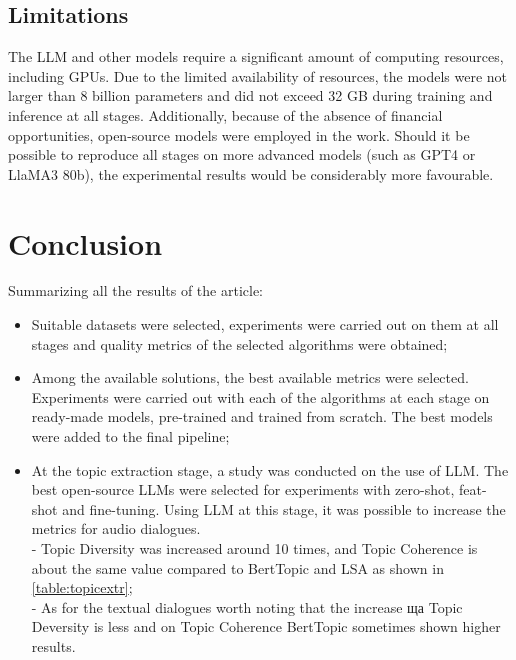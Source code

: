 \documentclass[PMI,VKR]{HSEUniversity}
\begin{document}
\section{Limitations}

The LLM and other models require a significant amount of computing resources, including GPUs. Due to the limited availability of resources, the models were not larger than 8 billion parameters and did not exceed 32 GB during training and inference at all stages. 
Additionally, because of the absence of financial opportunities, open-source models were employed in the work. Should it be possible to reproduce all stages on more advanced models (such as GPT4 or LlaMA3 80b), the experimental results would be considerably more favourable.

\chapter*{Conclusion}

Summarizing all the results of the article:
\begin{itemize}
    \item Suitable datasets were selected, experiments were carried out on them at all stages and quality metrics of the selected algorithms were obtained;
    \item Among the available solutions, the best available metrics were selected. Experiments were carried out with each of the algorithms at each stage on ready-made models, pre-trained and trained from scratch. The best models were added to the final pipeline;
    \item At the topic extraction stage, a study was conducted on the use of LLM. The best open-source LLMs were selected for experiments with zero-shot, feat-shot and fine-tuning. Using LLM at this stage, it was possible to increase the metrics for audio dialogues. \\
     - Topic Diversity was increased around 10 times, and Topic Coherence is about the same value compared to BertTopic and LSA as shown in \ref{table:topicextr}; \\
     - As for the textual dialogues worth noting that the increase ща Topic Deversity is less and on Topic Coherence BertTopic sometimes shown higher results.
\end{itemize}

\putbibliography
\nocite{hydro:2023}
\nocite{sesseg:2016}
\nocite{todbert:2020}
\nocite{topaware:2020}
\nocite{Plaquet23:2023}
\nocite{dialsystem:2018}
\nocite{jointmdl:2020}
\nocite{clusterllm:2023}
\nocite{atnm:2023}
\nocite{plsa:2013}
\end{document}
